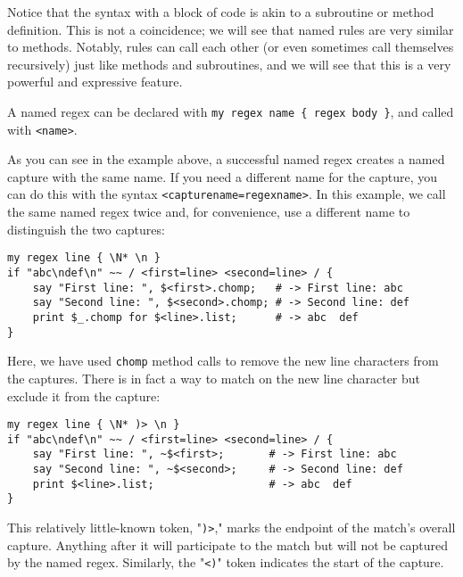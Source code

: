 Notice that the syntax with a block of code is akin 
to a subroutine or method definition. This is not a 
coincidence; we will see that named rules are very 
similar to methods. Notably, rules can call 
each other (or even sometimes call themselves 
recursively) just like methods and subroutines, and we will see 
that this is a very powerful and expressive feature.

A named regex can be declared with 
\verb'my regex name { regex body }', and called with 
{\tt <name>}. 

As you can see in the example above, a successful named 
regex creates a named capture with the same name. If you 
need a different name for the capture, you can do this 
with the syntax {\tt <capturename=regexname>}. In this 
example, we call the same named regex twice and, 
for convenience, use a different name to distinguish 
the two captures:

\begin{verbatim}
my regex line { \N* \n }
if "abc\ndef\n" ~~ / <first=line> <second=line> / {
    say "First line: ", $<first>.chomp;   # -> First line: abc
    say "Second line: ", $<second>.chomp; # -> Second line: def
    print $_.chomp for $<line>.list;      # -> abc  def
}
\end{verbatim}

Here, we have used {\tt chomp} method calls to remove 
the new line characters from the captures. There is in 
fact a way to match on the new line character but exclude 
it from the capture:
\begin{verbatim}
my regex line { \N* )> \n }
if "abc\ndef\n" ~~ / <first=line> <second=line> / {
    say "First line: ", ~$<first>;       # -> First line: abc
    say "Second line: ", ~$<second>;     # -> Second line: def
    print $<line>.list;                  # -> abc  def
}
\end{verbatim}

This relatively little-known token, "\verb')>'," marks 
the endpoint of the match's overall capture. Anything 
after it will participate to the match but will not 
be captured by the named regex. Similarly, the "\verb'<)'" 
token indicates the start of the capture.

